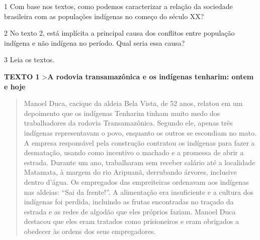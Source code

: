 
\num{1} Com base nos textos, como podemos caracterizar a relação da
sociedade brasileira com as populações indígenas no começo do século XX?


\num{2} No texto 2, está implícita a principal causa dos conflitos entre
população indígena e não indígena no período. Qual seria essa causa?


\num{3} Leia os textos.

\textbf{TEXTO 1}
\textgreater{}\textbf{A rodovia transamazônica e os indígenas tenharim: ontem e hoje}

\begin{quote}
Manoel Duca, cacique da aldeia Bela Vista, de 52 anos, relatou em um
depoimento que os indígenas Tenharim tinham muito medo dos trabalhadores
da rodovia Transamazônica. Segundo ele, apenas três indígenas
representavam o povo, enquanto os outros se escondiam no mato. A empresa
responsável pela construção contratou os indígenas para fazer a
desmatação, usando como incentivo o machado e a promessa de abrir a
estrada. Durante um ano, trabalharam sem receber salário até a
localidade Matamata, à margem do rio Aripuanã, derrubando árvores,
inclusive dentro d'água. Os empregados das empreiteiras ordenavam aos
indígenas nas aldeias: ``Sai da frente!''. A alimentação era
insuficiente e a cultura dos indígenas foi perdida, incluindo as frutas
encontradas no traçado da estrada e as redes de algodão que eles
próprios faziam. Manoel Duca destacou que eles eram tratados como
prisioneiros e eram obrigados a obedecer às ordens dos seus
empregadores.
\end{quote}


